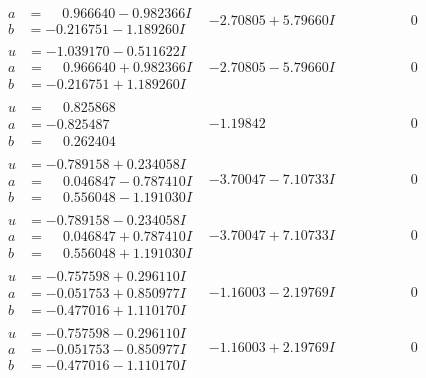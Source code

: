 \documentclass[1p]{elsarticle_modified}
\theoremstyle{definition}
\begin{document}
$$\begin{array}{c|c|c}
\begin{aligned}
a &= \phantom{-}0.966640 - 0.982366 I \\
b &= -0.216751 - 1.189260 I\end{aligned}
 & -2.70805 + 5.79660 I & \phantom{-0.000000 } 0 \\ \hline\begin{aligned}
u &= -1.039170 - 0.511622 I \\
a &= \phantom{-}0.966640 + 0.982366 I \\
b &= -0.216751 + 1.189260 I\end{aligned}
 & -2.70805 - 5.79660 I & \phantom{-0.000000 } 0 \\ \hline\begin{aligned}
u &= \phantom{-}0.825868\phantom{ +0.000000I} \\
a &= -0.825487\phantom{ +0.000000I} \\
b &= \phantom{-}0.262404\phantom{ +0.000000I}\end{aligned}
 & -1.19842\phantom{ +0.000000I} & \phantom{-0.000000 } 0 \\ \hline\begin{aligned}
u &= -0.789158 + 0.234058 I \\
a &= \phantom{-}0.046847 - 0.787410 I \\
b &= \phantom{-}0.556048 - 1.191030 I\end{aligned}
 & -3.70047 - 7.10733 I & \phantom{-0.000000 } 0 \\ \hline\begin{aligned}
u &= -0.789158 - 0.234058 I \\
a &= \phantom{-}0.046847 + 0.787410 I \\
b &= \phantom{-}0.556048 + 1.191030 I\end{aligned}
 & -3.70047 + 7.10733 I & \phantom{-0.000000 } 0 \\ \hline\begin{aligned}
u &= -0.757598 + 0.296110 I \\
a &= -0.051753 + 0.850977 I \\
b &= -0.477016 + 1.110170 I\end{aligned}
 & -1.16003 - 2.19769 I & \phantom{-0.000000 } 0 \\ \hline\begin{aligned}
u &= -0.757598 - 0.296110 I \\
a &= -0.051753 - 0.850977 I \\
b &= -0.477016 - 1.110170 I\end{aligned}
 & -1.16003 + 2.19769 I & \phantom{-0.000000 } 0 \\ \hline\begin{aligned}

\end{aligned}
\end{array}$$
\end{document}
